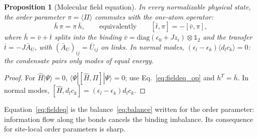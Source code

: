 \documentclass[reprint,aps,prd,amsmath,amssymb,superscriptaddress,nofootinbib,floatfix]{revtex4-2}
\theoremstyle{plain}
\newtheorem{proposition}{Proposition}
\theoremstyle{definition}
\theoremstyle{remark}
\newcommand{\ket}[1]{\ensuremath{|#1\rangle}}
\newcommand{\Hc}{\hat{H}}
\newcommand{\one}{\mathbb{1}}
\begin{document}
\begin{proposition}[Molecular field equation]
\label{prop:fieldeq}
In every normalizable physical state, the order parameter $\pi=\langle\Pi\rangle$ commutes with the one-atom operator:
\begin{equation}
\bar h\,\pi=\pi\,\bar h,\qquad\text{equivalently}\qquad [\bar t,\pi]=-[\bar v,\pi],
\label{eq:fieldeq}
\end{equation}
where $\bar h=\bar v+\bar t$ splits into the binding $\bar v=\mathrm{diag}(\epsilon_0+Jz_i)\otimes\one_2$ and the transfer $\bar t=-J\bar A_U$, with
$(\bar A_U)_{ij}=\bar U_{ij}$ on links. In normal modes, $(\epsilon_l-\epsilon_k)\langle d_lc_k\rangle=0$: the condensate pairs only modes of equal
energy.
\end{proposition}
\begin{proof}
For $\Hc\ket\Psi=0$, $\langle\Psi|[\Hc,\Pi]|\Psi\rangle=0$; use Eq.~\eqref{eq:fieldeq_op} and $h^T=\bar h$. In normal modes,
$[\Hc,d_lc_k]=(\epsilon_l-\epsilon_k)d_lc_k$.
\end{proof}
Equation~\eqref{eq:fieldeq} is the balance~\eqref{eq:balance} written for the order parameter: information flow along the bonds
cancels the binding imbalance. Its consequence for site-local order parameters is sharp.
\end{document}
